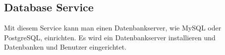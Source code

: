\subsection{Database Service}

Mit diesem Service kann man einen Datenbankserver, wie MySQL oder PostgreSQL,
einrichten. Es wird ein Datenbankserver installieren und Datenbanken
und Benutzer eingerichtet.




